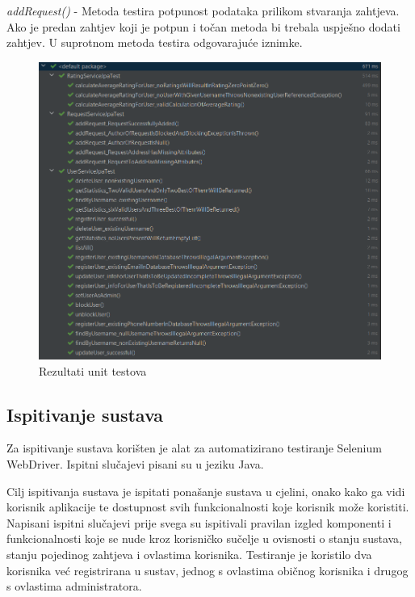 			\textit{addRequest()} - Metoda testira potpunost podataka prilikom stvaranja zahtjeva. Ako je predan zahtjev koji je potpun i točan metoda bi trebala uspješno dodati zahtjev. U suprotnom metoda testira odgovarajuće iznimke.
			
			\bigskip
			\begin{figure}[H]
				\includegraphics[scale=0.8]{slike/unit_testovi.png}
				\centering
				\caption{Rezultati unit testova}
				
			\end{figure}
			
			
			\subsection{Ispitivanje sustava}
			
			Za ispitivanje sustava korišten je alat za automatizirano testiranje Selenium WebDriver. Ispitni slučajevi pisani
			su u jeziku Java. \newline
			
			Cilj ispitivanja sustava je ispitati ponašanje sustava u cjelini, onako kako ga vidi 
			korisnik aplikacije te dostupnost svih funkcionalnosti koje korisnik može koristiti.
			Napisani ispitni slučajevi prije svega su ispitivali pravilan izgled komponenti i funkcionalnosti koje se nude kroz korisničko sučelje u ovisnosti o stanju sustava, stanju pojedinog zahtjeva i ovlastima korisnika.
			Testiranje je koristilo dva korisnika već registrirana u sustav, jednog s ovlastima običnog korisnika i drugog s ovlastima administratora.\newline 
			
